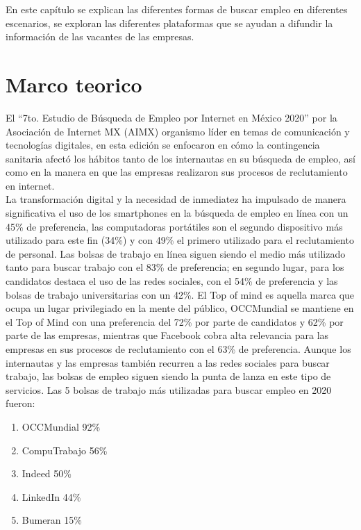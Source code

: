 \selectfont

En este capítulo se explican las diferentes formas de buscar empleo en diferentes escenarios, se 
exploran las diferentes plataformas que se ayudan a difundir la información de las vacantes de las empresas.

\section{Marco teorico}
    El ``7to. Estudio de Búsqueda de Empleo por Internet en México 2020'' por la Asociación de Internet MX (AIMX)
    organismo líder en temas de comunicación y tecnologías digitales, en esta edición se enfocaron en cómo la
    contingencia sanitaria afectó los hábitos tanto de los internautas en su búsqueda de empleo, así como en la manera en
    que las empresas realizaron sus procesos de reclutamiento en internet.\\
    \newline
    La transformación digital y la necesidad de inmediatez ha impulsado de manera significativa el uso de los smartphones
    en la búsqueda de empleo en línea con un 45\% de preferencia, las computadoras portátiles son el segundo dispositivo
    más utilizado para este fin (34\%) y con 49\% el primero utilizado para el reclutamiento de personal. Las bolsas de
    trabajo en línea siguen siendo el medio más utilizado tanto para buscar trabajo con el 83\% de preferencia; en segundo
    lugar, para los candidatos destaca el uso de las redes sociales, con el 54\% de preferencia y las bolsas de trabajo
    universitarias con un 42\%. 
    El Top of mind es aquella marca que ocupa un lugar privilegiado en la mente del público, OCCMundial se mantiene
    en el Top of Mind con una preferencia del 72\% por parte de candidatos y 62\% por parte de las empresas, mientras que
    Facebook cobra alta relevancia para las empresas en sus procesos de reclutamiento con el 63\% de preferencia.
    Aunque los internautas y las empresas también recurren a las redes sociales para buscar trabajo, las bolsas de empleo
    siguen siendo la punta de lanza en este tipo de servicios. Las 5 bolsas de trabajo más utilizadas para buscar empleo en
    2020 fueron:
    \begin{enumerate}
        \item OCCMundial 92\%
        \item CompuTrabajo 56\%
        \item Indeed 50\%
        \item LinkedIn 44\%
        \item Bumeran 15\%
    \end{enumerate}

